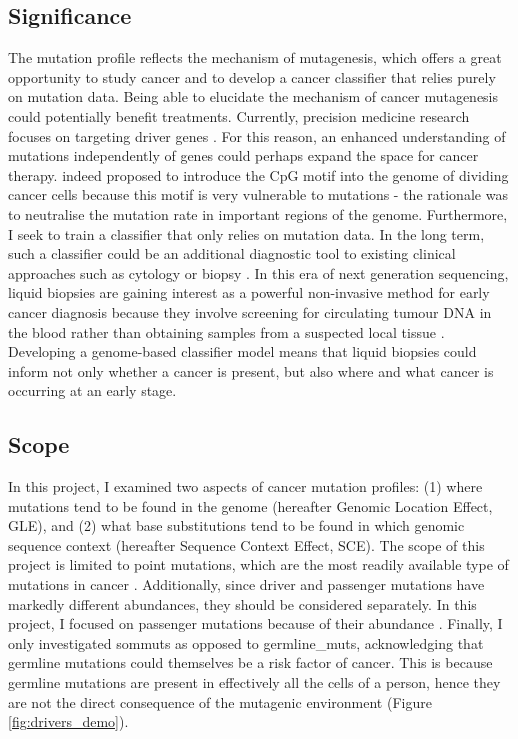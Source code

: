 

\subsection{Significance}
The mutation profile reflects the mechanism of mutagenesis, which offers a great opportunity to study cancer and to develop a cancer classifier that relies purely on mutation data. Being able to elucidate the mechanism of cancer mutagenesis could potentially benefit treatments. Currently, precision medicine research focuses on targeting driver genes \citep{Mukherjee2019Genomics-GuidedCancer}. For this reason, an enhanced understanding of mutations independently of genes could perhaps expand the space for cancer therapy. \citet{Chowdhury2018PresenceNucleotides} indeed proposed to introduce the CpG motif into the genome of dividing cancer cells because this motif is very vulnerable to mutations - the rationale was to neutralise the mutation rate in important regions of the genome. Furthermore, I seek to train a \gls{classifier} that only relies on mutation data. In the long term, such a classifier could be an additional diagnostic tool to existing clinical approaches such as cytology or biopsy \citep{Stone1995Biopsy:Pitfalls}. In this era of next generation sequencing, liquid biopsies are gaining interest as a powerful non-invasive method for early cancer diagnosis because they involve screening for circulating tumour DNA in the blood rather than obtaining samples from a suspected local tissue \citep{Chen2019Next-generationDetection}. Developing a genome-based classifier model means that liquid biopsies could inform not only whether a cancer is present, but also where and what cancer is occurring at an early stage.  

\subsection{Scope}
In this project, I examined two aspects of cancer mutation profiles: (1) where mutations tend to be found in the genome (hereafter Genomic Location Effect, GLE), and (2) what base substitutions tend to be found in which genomic sequence context (hereafter Sequence Context Effect, SCE). The scope of this project is limited to point mutations, which are the most readily available type of mutations in cancer \citep{Alexandrov2020}. Additionally, since driver and passenger mutations have markedly different abundances, they should be considered separately. In this project, I focused on passenger mutations because of their abundance \citep{McFarland2014Tug-of-warProcesses}. Finally, I only investigated \glspl{sommut} as opposed to \glspl{germline_mut}, acknowledging that germline mutations could themselves be a risk factor of cancer. This is because germline mutations are present in effectively all the cells of a person, hence they are not the direct consequence of the mutagenic environment (Figure \ref{fig:drivers_demo}).

